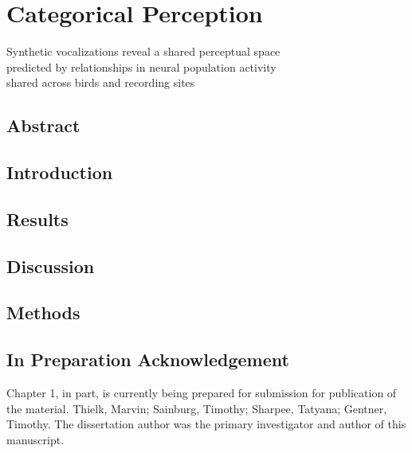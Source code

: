 \chapter{Categorical Perception}
\begin{flushright}
{\large Synthetic vocalizations reveal a shared perceptual space\\ predicted by relationships in neural population activity\\ shared across birds and recording sites}
\end{flushright}

\section{Abstract}


\section{Introduction}


\section{Results}


\section{Discussion}


\section{Methods}


\section{In Preparation Acknowledgement}
Chapter 1, in part, is currently being prepared for submission for publication of the material. Thielk, Marvin; Sainburg, Timothy; Sharpee, Tatyana; Gentner, Timothy. The dissertation author was the primary investigator and author of this manuscript.


\renewcommand{\figurename}{Supplementary Figure}

\renewcommand{\figurename}{Figure}
